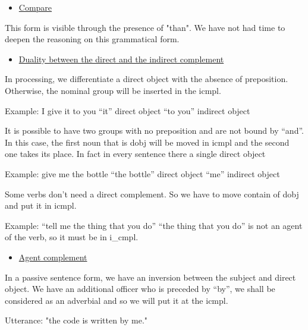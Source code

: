 \documentclass[twoside,a4paper,10pt]{report}
\newcommand{\dokuunderline}[1]{\underline{#1}}
\newcommand{\dokuitem}{\item}
\begin{document}
\begin{itemize}
\dokuitem  \dokuunderline{Compare}
\end{itemize}
This form is visible through the presence of "than". We have not had time to deepen the reasoning on this grammatical form.



\begin{itemize}
\dokuitem  \dokuunderline{Duality between the direct and the indirect complement}
\end{itemize}
In processing, we differentiate a direct object with the absence of preposition. Otherwise, the nominal group will be inserted in the i{\textunderscore}cmpl.


\small
\begin{verbatimtab}
  Example: I give it to you	
  “it” direct object
  “to you” indirect object
\end{verbatimtab}
\normalsize
It is possible to have two groups with no preposition and are not bound by “and”. In this case, the first noun that is d{\textunderscore}obj will be moved in i{\textunderscore}cmpl and the second one takes its place. In fact in every sentence there a single direct object


\small
\begin{verbatimtab}
  Example: give me the bottle
  “the bottle” direct object
  “me” indirect object
\end{verbatimtab}
\normalsize
Some verbs don’t need a direct complement. So we have to move contain of d{\textunderscore}obj and put it in i{\textunderscore}cmpl.


\small
\begin{verbatimtab}
  Example: “tell me the thing that you do”
  “the thing that you do” is not an agent of the verb, so it must be in i_cmpl.
\end{verbatimtab}
\normalsize

\begin{itemize}
\dokuitem  \dokuunderline{Agent complement}
\end{itemize}
In a passive sentence form, we have an inversion between the subject and direct object. We have an additional officer who is preceded by “by”, we shall be considered as an adverbial and so we will put it at the i{\textunderscore}cmpl.


\small
\begin{verbatimtab}
  Utterance: "the code is written by me."
\end{verbatimtab}
\normalsize
\end{document}
